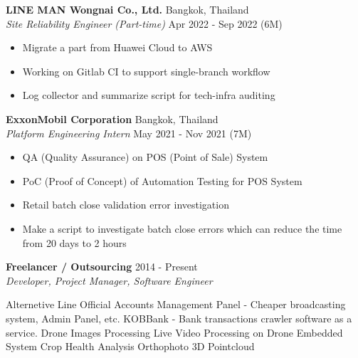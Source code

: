 \textbf{LINE MAN Wongnai Co., Ltd.} \hfill Bangkok, Thailand\\
\textit{Site Reliability Engineer (Part-time)} \hfill Apr 2022 - Sep 2022 (6M)\\
\vspace{-1mm}
\begin{itemize}
	\item Migrate a part from Huawei Cloud to AWS
	\item Working on Gitlab CI to support single-branch workflow
	\item Log collector and summarize script for tech-infra auditing
\end{itemize}
\vspace{-1mm}
\textbf{ExxonMobil Corporation} \hfill Bangkok, Thailand\\
\textit{Platform Engineering Intern} \hfill May 2021 - Nov 2021 (7M)\\
\vspace{-1mm}
\begin{itemize}
	\item QA (Quality Assurance) on POS (Point of Sale) System
	\item PoC (Proof of Concept) of Automation Testing for POS System
	\item Retail batch close validation error investigation
	\item Make a script to investigate batch close errors which can reduce the time from 20 days to 2 hours
\end{itemize}
\vspace{-1mm}
\textbf{Freelancer / Outsourcing} \hfill 2014 - Present\\
\textit{Developer, Project Manager, Software Engineer}\\
\vspace{-1mm}
\begin{outline}
	    \1 Alternetive Line Official Accounts Management Panel - Cheaper broadcasting system, Admin Panel, etc.
	    \1 KOBBank - Bank transactions crawler software as a service.
		\1 Drone Images Processing 
			\2 Live Video Processing on Drone Embedded System
			\2 Crop Health Analysis
			\2 Orthophoto
			\2 3D Pointcloud
\end{outline}
\vspace{2mm}

